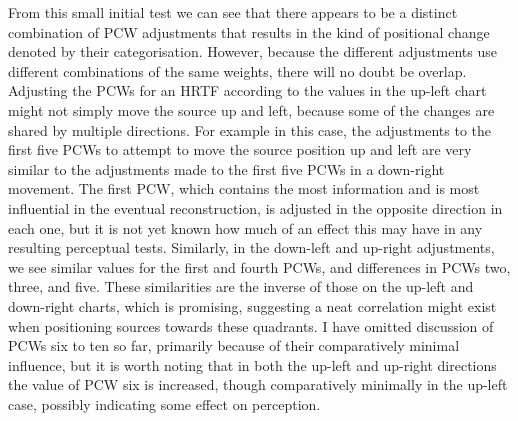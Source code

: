 From this small initial test we can see that there appears to be a distinct combination of PCW adjustments that results in the kind of positional change denoted by their categorisation. However, because the different adjustments use different combinations of the same weights, there will no doubt be overlap. Adjusting the PCWs for an HRTF according to the values in the up-left chart might not simply move the source up and left, because some of the changes are shared by multiple directions. For example in this case, the adjustments to the first five PCWs to attempt to move the source position up and left are very similar to the adjustments made to the first five PCWs in a down-right movement. The first PCW, which contains the most information and is most influential in the eventual reconstruction, is adjusted in the opposite direction in each one, but it is not yet known how much of an effect this may have in any resulting perceptual tests. Similarly, in the down-left and up-right adjustments, we see similar values for the first and fourth PCWs, and differences in PCWs two, three, and five. These similarities are the inverse of those on the up-left and down-right charts, which is promising, suggesting a neat correlation might exist when positioning sources towards these quadrants. I have omitted discussion of PCWs six to ten so far, primarily because of their comparatively minimal influence, but it is worth noting that in both the up-left and up-right directions the value of PCW six is increased, though comparatively minimally in the up-left case, possibly indicating some effect on perception. 